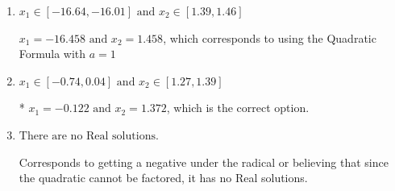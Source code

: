\documentclass{extbook}[14pt]
\begin{document}
\begin{enumerate}
{\begin{enumerate}[label=\Alph*.]
 $x_1 = -1.372 \text{ and } x_2 = 0.122$, which corresponds to writing the Quadratic Formula as $\frac{b \pm \sqrt{b^2 - 4ac}}{2a}$
\item \( x_1 \in [-16.64, -16.01] \text{ and } x_2 \in [1.39, 1.46] \)

 $x_1 = -16.458 \text{ and } x_2 = 1.458$, which corresponds to using the Quadratic Formula with $a=1$
\item \( x_1 \in [-0.74, 0.04] \text{ and } x_2 \in [1.27, 1.39] \)

* $x_1 = -0.122 \text{ and } x_2 = 1.372$, which is the correct option.
\item \( \text{There are no Real solutions.} \)

Corresponds to getting a negative under the radical or believing that since the quadratic cannot be factored, it has no Real solutions.
\end{enumerate}

}
\end{enumerate}
\end{document}
